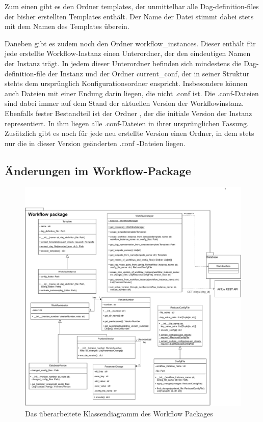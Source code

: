 Zum einen gibt es den Ordner \glqq templates\grqq{}, der unmittelbar alle Dag-definition-files der bisher erstellten Templates enthält. Der Name der Datei stimmt dabei stets mit dem Namen des Templates überein. 

Daneben gibt es zudem noch den Ordner \glqq workflow\_instances\grqq{}. Dieser enthält für jede erstellte Workflow-Instanz einen Unterordner, der den eindeutigen Namen der Instanz trägt. In jedem dieser Unterordner befinden sich mindestens die Dag-definition-file der Instanz und der Ordner \glqq current\_conf\grqq{}, der in seiner Struktur stehts dem ursprünglich Konfigurationsordner enspricht. Insbesondere können auch Dateien mit einer Endung darin liegen, die nicht \glqq.conf\grqq{} ist. Die \glqq .conf\grqq{}-Dateien sind dabei immer auf dem Stand der aktuellen Version der Workflowinstanz. Ebenfalls fester Bestandteil ist der Ordner \grqq{}, der die initiale Version der Instanz representiert. In ihm liegen alle \glqq.conf\grqq{}-Dateien in ihrer ursprünglichen Fassung. Zusätzlich gibt es noch für jede neu erstellte Version einen Ordner, in dem stets nur die in dieser Version geänderten \glqq.conf \grqq{}-Dateien liegen.

\subsection{Änderungen im Workflow-Package}

\begin{figure}[h]
            \label{workflow_klassen}
            \centerline{\includegraphics[scale=0.5]{res/workflow_class_diag.pdf}}
            \caption{Das überarbeitete Klassendiagramm des Workflow Packages}
\end{figure}

